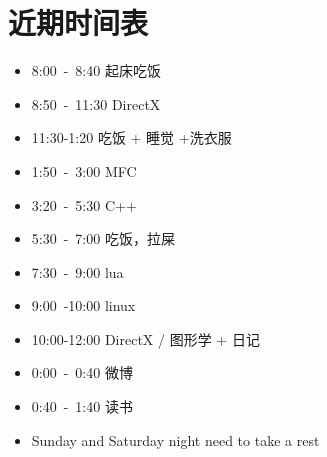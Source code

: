 \documentclass[UTF8,a4paper,8pt]{ctexbook}
\begin{document}
    \section*{近期时间表}
     \begin{itemize}
     	\item 8:00\ -\ 8:40 起床吃饭
     	\item 8:50\ -\ 11:30 DirectX
     	\item 11:30-1:20  吃饭 + 睡觉 +洗衣服
    	\item 1:50\ -\ 3:00  MFC
     	\item 3:20\ -\ 5:30  C++
     	\item 5:30\ -\ 7:00  吃饭，拉屎
     	\item 7:30\ -\ 9:00  lua
     	\item 9:00\ -10:00   linux
        \item 10:00-12:00 DirectX / 图形学  + 日记
        \item 0:00\ -\ 0:40 微博
        \item 0:40\ -\ 1:40 读书
        \item Sunday and Saturday night need to take a rest
      \end{itemize} 	
     		    
     		     
\end{document}
